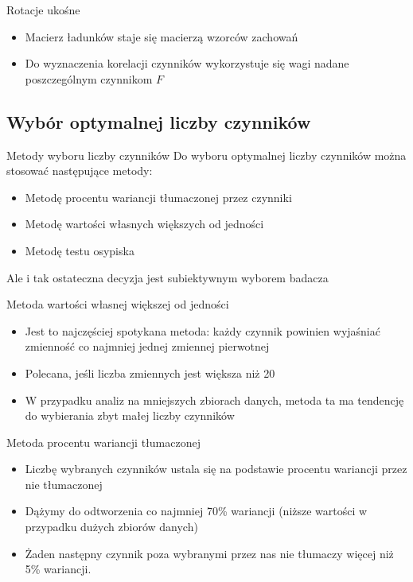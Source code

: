 \documentclass{beamer}
\begin{document}
\begin{frame}{Rotacje ukośne}
  \begin{itemize}
  \item Macierz ładunków staje się macierzą wzorców zachowań
  \item Do wyznaczenia korelacji czynników wykorzystuje się wagi nadane poszczególnym czynnikom $F$
   \end{itemize}
\end{frame}

\subsection{Wybór optymalnej liczby czynników}

\begin{frame}{Metody wyboru liczby czynników}
  Do wyboru optymalnej liczby czynników można stosować następujące metody:
  \begin{itemize}
  \item Metodę procentu wariancji tłumaczonej przez czynniki
  \item Metodę wartości własnych większych od jedności
  \item Metodę testu osypiska
  \end{itemize}
  Ale i tak ostateczna decyzja jest subiektywnym wyborem badacza
\end{frame}

\begin{frame}{Metoda wartości własnej większej od jedności}
  \begin{itemize}
  \item Jest to najczęściej spotykana metoda: każdy czynnik powinien wyjaśniać zmienność co najmniej jednej zmiennej pierwotnej
  \item Polecana, jeśli liczba zmiennych jest większa niż 20
  \item W przypadku analiz na mniejszych zbiorach danych, metoda ta ma tendencję do wybierania zbyt małej liczby czynników
   \end{itemize}
\end{frame}

\begin{frame}{Metoda procentu wariancji tłumaczonej}
  \begin{itemize}
  \item Liczbę wybranych czynników ustala się na podstawie procentu wariancji przez nie tłumaczonej
  \item Dążymy do odtworzenia co najmniej 70\% wariancji (niższe wartości w przypadku dużych zbiorów danych)
  \item Żaden następny czynnik poza wybranymi przez nas nie tłumaczy więcej niż 5\% wariancji.
   \end{itemize}
\end{frame}
\end{document}
